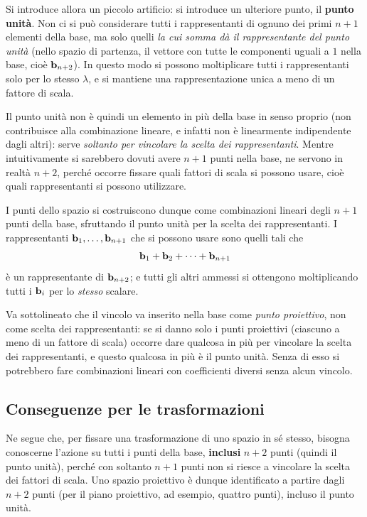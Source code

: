 Si introduce allora un piccolo artificio: si introduce un ulteriore punto, il \textbf{punto unità}. Non ci si può considerare tutti i rappresentanti di ognuno dei primi $n+1$ elementi della base, ma solo quelli \emph{la cui somma dà il rappresentante del punto unità} (nello spazio di partenza, il vettore con tutte le componenti uguali a $1$ nella base, cioè $\mathbf{b}_{n+2}$). In questo modo si possono moltiplicare tutti i rappresentanti solo per lo stesso $\lambda$, e si mantiene una rappresentazione unica a meno di un fattore di scala.

Il punto unità non è quindi un elemento in più della base in senso proprio (non contribuisce alla combinazione lineare, e infatti non è linearmente indipendente dagli altri): serve \emph{soltanto per vincolare la scelta dei rappresentanti}. Mentre intuitivamente si sarebbero dovuti avere $n+1$ punti nella base, ne servono in realtà $n+2$, perché occorre fissare quali fattori di scala si possono usare, cioè quali rappresentanti si possono utilizzare.

I punti dello spazio si costruiscono dunque come combinazioni lineari degli $n+1$ punti della base, sfruttando il punto unità per la scelta dei rappresentanti. I rappresentanti $\mathbf{b}_1,\dots,\mathbf{b}_{n+1}$ che si possono usare sono quelli tali che
\[
  \mathbf{b}_1+\mathbf{b}_2+\dots+\mathbf{b}_{n+1}
\]
è un rappresentante di $\mathbf{b}_{n+2}$; e tutti gli altri ammessi si ottengono moltiplicando tutti i $\mathbf{b}_i$ per lo \emph{stesso} scalare.

Va sottolineato che il vincolo va inserito nella base come \emph{punto proiettivo}, non come scelta dei rappresentanti: se si danno solo i punti proiettivi (ciascuno a meno di un fattore di scala) occorre dare qualcosa in più per vincolare la scelta dei rappresentanti, e questo qualcosa in più è il punto unità. Senza di esso si potrebbero fare combinazioni lineari con coefficienti diversi senza alcun vincolo.

\subsection{Conseguenze per le trasformazioni}

Ne segue che, per fissare una trasformazione di uno spazio in sé stesso, bisogna conoscerne l'azione su tutti i punti della base, \textbf{inclusi} $n+2$ punti (quindi il punto unità), perché con soltanto $n+1$ punti non si riesce a vincolare la scelta dei fattori di scala. Uno spazio proiettivo è dunque identificato a partire dagli $n+2$ punti (per il piano proiettivo, ad esempio, quattro punti), incluso il punto unità.

